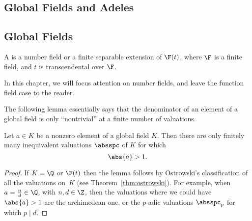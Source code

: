 \documentclass[11pt]{book}
\begin{document}
\begin{ch}
\chapter{Global Fields and Adeles}
\section{Global Fields}\label{sec:global_fields}
\begin{definition}
  A  is a number field or a finite separable
  extension of $\F(t)$, where $\F$ is a finite field, and $t$ is
  transcendental over $\F$.
\end{definition}

In this chapter, we will focus attention on number fields, and leave
the function field case to the reader.

The following lemma essentially says that the denominator of an
element of a global field is only ``nontrivial'' at a finite number of
valuations.
\begin{lemma}\label{lem:absbig}
Let $a\in K$ be a nonzero element of a global field $K$.  Then
there are only finitely many inequivalent valuations $\absspc$
of $K$ for which
$$
  \abs{a} > 1.
$$
\end{lemma}
\begin{proof}
  If $K=\Q$ or $\F(t)$ then the lemma follows by Ostrowski's
  classification of all the valuations on~$K$ (see
Theorem~\ref{thm:ostrowski}). For example,
  when $a=\frac{n}{d}\in\Q$, with $n,d\in \Z$, then the valuations
  where we could have $\abs{a}>1$ are the archimedean one, or the
  $p$-adic valuations $\absspc_p$ for which $p\mid d$.


\end{proof}
\end{ch}
\end{document}
